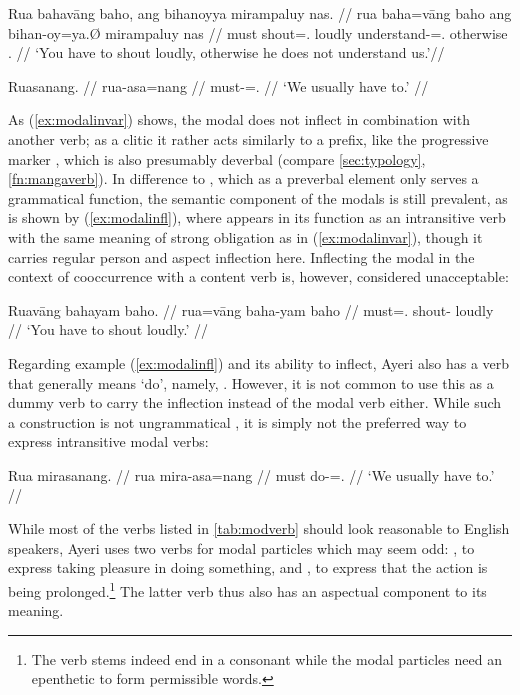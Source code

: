 \pex
\a\label{ex:modalinvar}\begingl
	\gla Rua bahavāng baho, ang bihanoyya mirampaluy nas. //
	\glb rua baha=vāng baho ang bihan-oy=ya.Ø mirampaluy nas //
	\glc must shout=\Ssg{}.\Aarg{} loudly \AgtT{} 
		understand-\Neg{}=\TsgM{}.\Top{} otherwise \Fpl{}.\Parg{} //
	\glft `You have to shout loudly, otherwise he does not understand 
		us.'//
\endgl

\a\label{ex:modalinfl}\begingl
	\gla Ruasanang. //
	\glb rua-asa=nang //
	\glc must-\Hab{}=\Fpl{}.\Aarg{} //
	\glft `We usually have to.' //
\endgl

\xe

As (\ref{ex:modalinvar}) shows, the modal does not inflect in combination with
another verb; as a clitic it rather acts similarly to a prefix, like the
progressive marker , which is also presumably deverbal
(compare \autoref{sec:typology}, \autoref{fn:mangaverb}). In difference to
, which as a preverbal element only serves a grammatical
function, the semantic component of the modals is still prevalent, as is shown
by (\ref{ex:modalinfl}), where  appears in its function as
an intransitive verb with the same meaning of strong obligation as in
(\ref{ex:modalinvar}), though it carries regular person and aspect inflection
here. Inflecting the modal in the context of cooccurrence with a content verb
is, however, considered unacceptable:

\ex\ljudge*\begingl
	\gla Ruavāng bahayam baho. //
	\glb rua=vāng baha-yam baho //
	\glc must=\Ssg{}.\AgtT{} shout-\Ptcp{} loudly //
	\glft `You have to shout loudly.' //
\endgl\xe

Regarding example (\ref{ex:modalinfl}) and its ability to inflect, Ayeri also
has a verb that generally means `do', namely, . However, it
is not common to use this as a dummy verb to carry the inflection instead of
the modal verb either. While such a construction is not ungrammatical , it is simply not the preferred way to express intransitive modal verbs:

\ex\ljudge\ques\begingl
	\gla Rua mirasanang. //
	\glb rua mira-asa=nang //
	\glc must do-\Hab{}=\Fpl{}.\Aarg{} //
	\glft `We usually have to.' //
\endgl\xe

While most of the verbs listed in \autoref{tab:modverb} should look 
reasonable to English speakers, Ayeri uses two verbs for modal particles which 
may seem odd: , to express taking pleasure in doing 
something, and , to express that the action is 
being prolonged.\footnote{The verb stems indeed end in a consonant while the 
modal particles need an epenthetic  to form permissible words.} The 
latter verb thus also has an aspectual component to its meaning.

